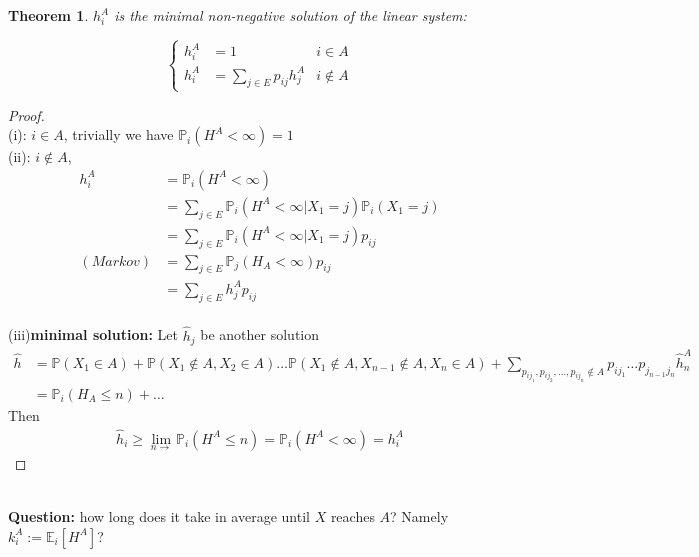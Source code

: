 \documentclass[a4paper,11pt]{book}
\newtheorem{theorem}{Theorem}[section]
\theoremstyle{definition}
\theoremstyle{remark}
\begin{document}
\begin{theorem}
$h_i^A$ is the minimal non-negative solution of the linear system:

\begin{equation*}
\left\{
\begin{aligned}
	h_i^A &= 1 						   &i \in A\\
	h_i^A &= \sum_{j \in E}p_{ij}h_j^A &i \notin A
\end{aligned}
\right.	
\end{equation*}
\end{theorem}
\begin{proof}\quad\\
(i): $i \in A$, trivially we have $\mathbb{P}_i(H^A < \infty) = 1$ \\
(ii): $i \notin A$,  
\begin{align*}
	h_i^A &= \mathbb{P}_i (H^A < \infty) \\
	&= \sum_{j \in E}\mathbb{P}_i(H^A< \infty|X_1 = j)\mathbb{P}_i(X_1 = j) \\
	&= \sum_{j \in E}\mathbb{P}_i(H^A< \infty|X_1 = j) p_{ij}\\
	(Markov)&= \sum_{j \in E}\mathbb{P}_j(H_A< \infty)p_{ij}\\
	&= \sum_{j \in E}h_j^A p_{ij}
\end{align*} \\
(iii)\textbf{minimal solution:} Let $\hat{h}_j$ be another solution
\begin{align*}
	\hat{h} &= \mathbb{P}(X_1 \in A) + \mathbb{P}(X_1 \notin A, X_2 \in A) \dots \mathbb{P}(X_1 \notin A, X_{n-1}\notin A, X_n \in A) + \sum_{p_{ij_1}, p_{ij_2}, \dots, p_{ij_n} \notin A} p_{ij_1} \dots p_{j_{n-1}j_n}\hat{h}_n^A\\
	&=  \mathbb{P}_i(H_A \le n) + \dots
\end{align*}
Then
\begin{align*}
	\hat{h}_i \geq \lim_{n \rightarrow}\mathbb{P}_i(H^A \le n) = \mathbb{P}_i(H^A < \infty) = h_i^A
\end{align*}
\end{proof}

\quad\\
\textbf{Question:} how long does it take in average until $X$ reaches $A$? Namely $k_i^A:= \mathbb{E}_i[H^A]$?
\end{document}
